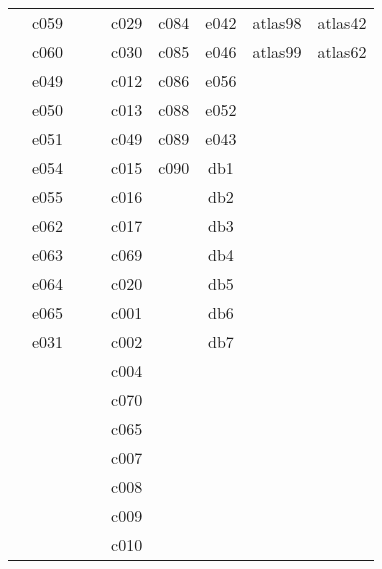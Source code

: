 \documentclass[10pt,letterpaper]{article}
\begin{document}
\begin{center}
\begin{tabular}{ |c|c|c|c|c|c|c|c|c| }
        & c059 &         &         & c029 & c084       & e042 & atlas98 & atlas42 \\
        & c060 &         &         & c030 & c085       & e046 & atlas99 & atlas62 \\
        & e049 &         &         & c012 & c086       & e056 &         &         \\
        & e050 &         &         & c013 & c088       & e052 &         &         \\
        & e051 &         &         & c049 & c089       & e043 &         &         \\
        & e054 &         &         & c015 & c090       & db1  &         &         \\
        & e055 &         &         & c016 &            & db2  &         &         \\
        & e062 &         &         & c017 &            & db3  &         &         \\
        & e063 &         &         & c069 &            & db4  &         &         \\
        & e064 &         &         & c020 &            & db5  &         &         \\
        & e065 &         &         & c001 &            & db6  &         &         \\
        & e031 &         &         & c002 &            & db7  &         &         \\
        &      &         &         & c004 &            &      &         &         \\
        &      &         &         & c070 &            &      &         &         \\
        &      &         &         & c065 &            &      &         &         \\
        &      &         &         & c007 &            &      &         &         \\
        &      &         &         & c008 &            &      &         &         \\
        &      &         &         & c009 &            &      &         &         \\
        &      &         &         & c010 &            &      &         &         \\


        \hline
        \end{tabular}
        \end{center}
\end{document}
